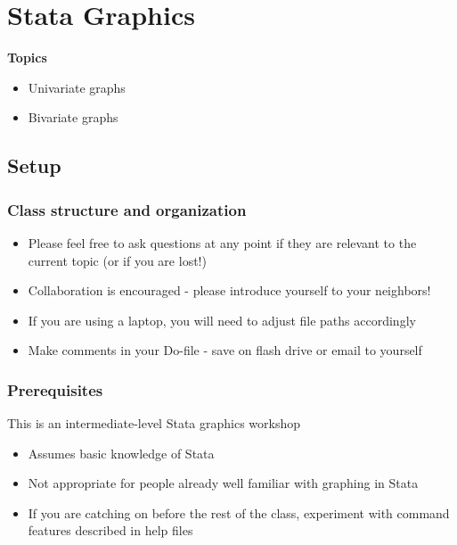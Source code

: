 \documentclass[
]{book}
\providecommand{\tightlist}{%
  \setlength{\itemsep}{0pt}\setlength{\parskip}{0pt}}
\begin{document}
\hypertarget{stata-graphics}{%
\chapter{Stata Graphics}\label{stata-graphics}}

\textbf{Topics}

\begin{itemize}
\tightlist
\item
  Univariate graphs
\item
  Bivariate graphs
\end{itemize}

\hypertarget{setup-9}{%
\section{Setup}\label{setup-9}}

\hypertarget{class-structure-and-organization-3}{%
\subsection{Class structure and organization}\label{class-structure-and-organization-3}}

\begin{itemize}
\tightlist
\item
  Please feel free to ask questions at any point if they are relevant to the current topic (or if you are lost!)
\item
  Collaboration is encouraged - please introduce yourself to your neighbors!
\item
  If you are using a laptop, you will need to adjust file paths accordingly
\item
  Make comments in your Do-file - save on flash drive or email to yourself
\end{itemize}

\hypertarget{prerequisites-9}{%
\subsection{Prerequisites}\label{prerequisites-9}}

This is an intermediate-level Stata graphics workshop

\begin{itemize}
\tightlist
\item
  Assumes basic knowledge of Stata
\item
  Not appropriate for people already well familiar with graphing in Stata
\item
  If you are catching on before the rest of the class, experiment with command features described in help files
\end{itemize}
\end{document}

